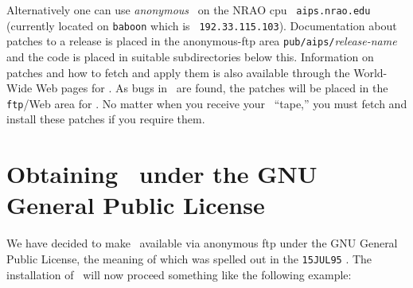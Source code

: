 Alternatively one can use {\it anonymous} \ftp\ on the NRAO cpu {\tt
aips.nrao.edu} (currently located on {\tt baboon} which is {\tt
192.33.115.103}).  Documentation about patches to a release is placed
in the anonymous-ftp area {\tt pub/aips/}{\it release-name} and the
code is placed in suitable subdirectories below this. Information on
patches and how to fetch and apply them is also available through the
World-Wide Web pages for \hbox{\AIPS}.  As bugs in \RELEASENAME\ are
found, the patches will be placed in the {\tt ftp}/Web area for
\hbox{{\RELEASENAME}}.  No matter when you receive your \RELEASENAME\
``tape,'' you must fetch and install these patches if you require
them.

\vfill\eject

\section{Obtaining \AIPS\ under the GNU General Public License}

We have decided to make \AIPS\ available via anonymous ftp under the
GNU General Public License, the meaning of which was spelled out in
the {\tt 15JUL95} \hbox{\Aipsletter}.  The installation of \AIPS\ will
now proceed something like the following example:

